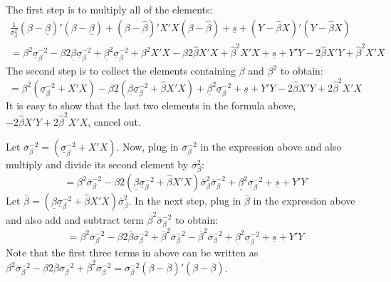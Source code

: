 \documentclass[
  letterpaper,
  DIV=11,
  numbers=noendperiod]{scrreprt}
\begin{document}
The first step is to multiply all of the elements: \begin{multline}
\frac{1}{\underline{\sigma}_{\beta}^2}(\beta-\underline{\beta})'(\beta-\underline{\beta}) + (\beta - \hat\beta)'X'X (\beta - \hat\beta) + \underline{s} + (Y-\hat\beta X)'(Y-\hat\beta X)\\
= \beta^2\underline{\sigma}_{\beta}^{-2} - \beta 2 \underline{\beta} \underline{\sigma}_{\beta}^{-2} + \underline{\beta}^2 \underline{\sigma}_{\beta}^{-2}+ \beta^2X'X - \beta 2 \hat\beta X'X + \hat\beta^2 X'X + \underline{s} + Y'Y -2\hat\beta X'Y + \hat\beta^2 X'X
\end{multline} The second step is to collect the elements containing
\(\beta\) and \(\beta^2\) to obtain: \begin{equation}
= \beta^2\left( \underline{\sigma}_{\beta}^{-2} + X'X\right) - \beta 2 \left( \underline{\beta} \underline{\sigma}_{\beta}^{-2} + \hat\beta X'X \right) + \underline{\beta}^2 \underline{\sigma}_{\beta}^{-2}  + \underline{s} + Y'Y -2\hat\beta X'Y + 2\hat\beta^2 X'X
\end{equation} It is easy to show that the last two elements in the
formula above, \(-2\hat\beta X'Y + 2\hat\beta^2 X'X\), cancel out.

Let
\(\overline{\sigma}_{\beta}^{-2} = \left( \underline{\sigma}_{\beta}^{-2} + X'X\right)\).
Now, plug in \(\overline{\sigma}_{\beta}^{-2}\) in the expression above
and also multiply and divide its second element by
\(\overline{\sigma}_{\beta}^{2}\): \begin{equation}
= \beta^2\overline{\sigma}_{\beta}^{-2} - \beta 2 \left( \underline{\beta} \underline{\sigma}_{\beta}^{-2} + \hat\beta X'X \right)\overline{\sigma}_{\beta}^{2}\overline{\sigma}_{\beta}^{-2} + \underline{\beta}^2 \underline{\sigma}_{\beta}^{-2}  + \underline{s} + Y'Y 
\end{equation} Let
\(\overline{\beta} = \left( \underline{\beta} \underline{\sigma}_{\beta}^{-2} + \hat\beta X'X \right)\overline{\sigma}_{\beta}^{2}\).
In the next step, plug in \(\overline{\beta}\) in the expression above
and also add and subtract term
\(\overline{\beta}^2 \overline{\sigma}_{\beta}^{-2}\) to obtain:
\begin{equation}
= \beta^2\overline{\sigma}_{\beta}^{-2} - \beta 2 \overline{\beta}\overline{\sigma}_{\beta}^{-2} + \overline{\beta}^2 \overline{\sigma}_{\beta}^{-2} - \overline{\beta}^2 \overline{\sigma}_{\beta}^{-2} + \underline{\beta}^2 \underline{\sigma}_{\beta}^{-2}  + \underline{s} + Y'Y 
\end{equation} Note that the first three terms in above can be written
as
\(\beta^2\overline{\sigma}_{\beta}^{-2} - \beta 2 \overline{\beta}\overline{\sigma}_{\beta}^{-2} + \overline{\beta}^2 \overline{\sigma}_{\beta}^{-2} = \overline{\sigma}_{\beta}^{-2}\left(\beta-\overline{\beta}\right)'\left(\beta-\overline{\beta}\right)\).
\end{document}
